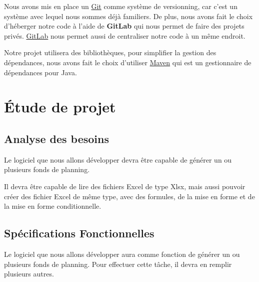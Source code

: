 \documentclass{polytech/polytech}
\begin{document}
	Nous avons mis en place un \href{https://git-scm.com/}{Git} comme système de versionning, car c'est un système avec lequel nous sommes déjà familiers.
	De plus, nous avons fait le choix d'héberger notre code à l'aide de \textbf{GitLab} qui nous permet de faire des projets privés.
	\href{https://about.gitlab.com/}{GitLab} nous permet aussi de centraliser notre code à un même endroit.

	Notre projet utilisera des bibliothèques, pour simplifier la gestion des dépendances, nous avons fait le choix d'utiliser \href{https://maven.apache.org/}{Maven} qui est un gestionnaire de dépendances pour Java.

	\chapter{Étude de projet}
	\section{Analyse des besoins}

	Le logiciel que nous allons développer devra être capable de générer un ou plusieurs fonds de planning.

	Il devra être capable de lire des fichiers Excel de type Xlsx,
	mais aussi pouvoir créer des fichier Excel de même type, avec des formules, de la mise en forme et de la mise en forme conditionnelle.

	\section{Spécifications Fonctionnelles}

	Le logiciel que nous allons développer aura comme fonction de générer un ou plusieurs fonds de planning. Pour effectuer cette tâche, il devra en remplir plusieurs autres.
\end{document}

